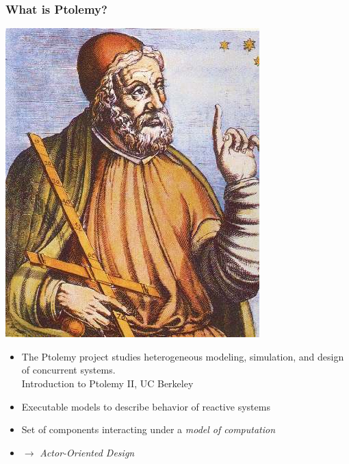 \documentclass[notes,handout]{beamer}
\newcommand{\myquote}[1]{\glqq #1\grqq}
\begin{document}
\begin{frame}
  \frametitle{What is Ptolemy?}
  
\begin{center}
\includegraphics[scale=0.20]{images/clausptolemaeus.jpg}
\end{center}
  
\begin{itemize}
	\item \myquote{The Ptolemy project studies heterogeneous modeling, simulation, and design of concurrent systems.}
	\tiny\\\hspace{5cm}Introduction to Ptolemy II, UC Berkeley
 	\pause
 	\small
  \item Executable models to describe behavior of reactive systems
	\pause
	\item Set of components interacting under a \emph{model of computation}
	\pause
	\item $\rightarrow$ \emph{Actor-Oriented Design}
\end{itemize}
  
\end{frame}
\end{document}
